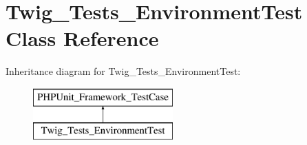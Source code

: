 \hypertarget{classTwig__Tests__EnvironmentTest}{}\section{Twig\+\_\+\+Tests\+\_\+\+Environment\+Test Class Reference}
\label{classTwig__Tests__EnvironmentTest}
Inheritance diagram for Twig\+\_\+\+Tests\+\_\+\+Environment\+Test\+:\begin{figure}[H]
\begin{center}
\leavevmode
\includegraphics[height=2.000000cm]{classTwig__Tests__EnvironmentTest}
\end{center}
\end{figure}
